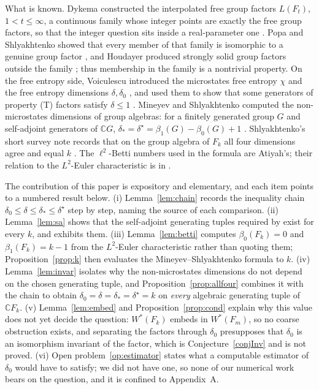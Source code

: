 \documentclass[11pt]{article}
\theoremstyle{plain}
\theoremstyle{definition}
\theoremstyle{remark}
\newcommand{\C}{\mathbb{C}}\newcommand{\N}{\mathbb{N}}
\begin{document}
What is known. Dykema constructed the interpolated free group factors $L(F_t)$, $1<t\le\infty$, a continuous family whose integer points are exactly the free group factors, so that the integer question sits inside a real-parameter one \cite{Dyk94}. Popa and Shlyakhtenko showed that every member of that family is isomorphic to a genuine group factor \cite{PS20}, and Houdayer produced strongly solid group factors outside the family \cite{Hou09}; thus membership in the family is a nontrivial property. On the free entropy side, Voiculescu introduced the microstates free entropy $\chi$ and the free entropy dimensions $\delta,\delta_0$ \cite{Voi94}, and used them to show that some generators of property (T) factors satisfy $\delta\le 1$ \cite{Voi99}. Mineyev and Shlyakhtenko computed the non-microstates dimensions of group algebras: for a finitely generated group $G$ and self-adjoint generators of $\C G$, $\delta_*=\delta^\star=\beta_1(G)-\beta_0(G)+1$ \cite{MS05}. Shlyakhtenko's short survey note records that on the group algebra of $F_k$ all four dimensions agree and equal $k$ \cite{Sh06}. The $\ell^2$-Betti numbers used in the formula are Atiyah's; their relation to the $L^2$-Euler characteristic is in \cite{At76}.

The contribution of this paper is expository and elementary, and each item points to a numbered result below. (i) Lemma~\ref{lem:chain} records the inequality chain $\delta_0\le\delta\le\delta_*\le\delta^\star$ step by step, naming the source of each comparison. (ii) Lemma~\ref{lem:sa} shows that the self-adjoint generating tuples required by \cite{MS05} exist for every $k$, and exhibits them. (iii) Lemma~\ref{lem:betti} computes $\beta_0(F_k)=0$ and $\beta_1(F_k)=k-1$ from the $L^2$-Euler characteristic rather than quoting them; Proposition~\ref{prop:k} then evaluates the Mineyev--Shlyakhtenko formula to $k$. (iv) Lemma~\ref{lem:invar} isolates why the non-microstates dimensions do not depend on the chosen generating tuple, and Proposition~\ref{prop:allfour} combines it with the chain to obtain $\delta_0=\delta=\delta_*=\delta^\star=k$ on \emph{every} algebraic generating tuple of $\C F_k$. (v) Lemma~\ref{lem:embed} and Proposition~\ref{prop:cond} explain why this value does not yet decide the question: $W^*(F_k)$ embeds in $W^*(F_m)$, so no coarse obstruction exists, and separating the factors through $\delta_0$ presupposes that $\delta_0$ is an isomorphism invariant of the factor, which is Conjecture~\ref{conjInv} and is not proved. (vi) Open problem~\ref{op:estimator} states what a computable estimator of $\delta_0$ would have to satisfy; we did not have one, so none of our numerical work bears on the question, and it is confined to Appendix~A.
\end{document}
